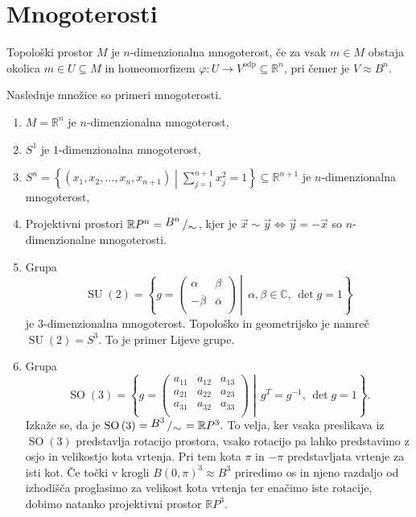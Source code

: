 % 


\section{Mnogoterosti}%

\begin{definicija}
\label{def_mnt}
Topološki prostor $M$
je $n$-dimenzionalna mnogoterost, če za vsak $m \in M$
obstaja okolica $m \in U \subseteq M$ in homeomorfizem
$\varphi : U \to V^{\text{odp}} \subseteq
\mathbb{R}^n$, pri čemer je $V \approx B^{n}$.
\end{definicija}


\begin{primer}
Naslednje množice so primeri mnogoterosti.
\begin{enumerate}
	\item $M = \mathbb{R}^n$ je
$n$-dimenzionalna mnogoterost,
	\item $S^1$ je
$1$-dimenzionalna mnogoterost,
  \item $S^{n} =
\left\{\left( x_1, x_2, \ldots, x_n, x_{n+1}
\right) \middle| \sum_{j=1}^{n+1} x_{j}^2 =
1\right\} \subseteq \mathbb{R}^{n+1}$ je
$n$-dimenzionalna mnogoterost,
	\item Projektivni
prostori $\mathbb{R}P^{n} = \bigslant{B^{n}}{\sim} $,
kjer je $\vec{x} \sim \vec{y}  \iff \vec{y}  =
-\vec{x}$ so $n$-dimenzionalne mnogoterosti.
	\item Grupa \begin{equation*} \operatorname{SU}\left( 2 \right) = \left\{ g
= \begin{pmatrix}
\alpha & \beta \\ -
\overline{\beta}  & \overline{\alpha}  \\
\end{pmatrix}
\middle|\, \alpha, \beta \in  \mathbb{C}, \, \det
g = 1 \right\} 	\end{equation*}je $3$-dimenzionalna mnogoterost. Topološko in
geometrijsko je namreč $\operatorname{SU}\left( 2 \right) = S^3.$ To
je primer Lijeve grupe.
	\item Grupa \begin{equation*}
\operatorname{SO}\left( 3 \right) =
\left\{ g =
\begin{pmatrix} a_{11} &
a_{12} & a_{13} \\ a_{21} & a_{22}
& a_{23} \\ a_{31} & a_{32}
& a_{33} \\
\end{pmatrix}
\middle|\, g^{T} = g^{-1}, \, \det  g
= 1 \right\}. \end{equation*} Izkaže se, da je
$\operatorname{SO}\left( 3\right ) =
\bigslant{B^3}{\sim } = \mathbb{R}P^3.$ To
velja, ker vsaka preslikava iz
$\operatorname{SO}\left( 3\right )$
predstavlja rotacijo prostora, vsako
rotacijo pa lahko predstavimo z osjo in
velikostjo kota vrtenja. Pri tem kota $\pi$
in $-\pi$ predstavljata vrtenje za isti
kot. Če točki v krogli $B\left( 0, \pi
\right)^{3} \approx B^3$ priredimo os in njeno
razdaljo od izhodišča proglasimo za velikost kota vrtenja
ter enačimo iste rotacije, dobimo natanko projektivni prostor
$\mathbb{R}P^3$.
\end{enumerate}
\end{primer}

